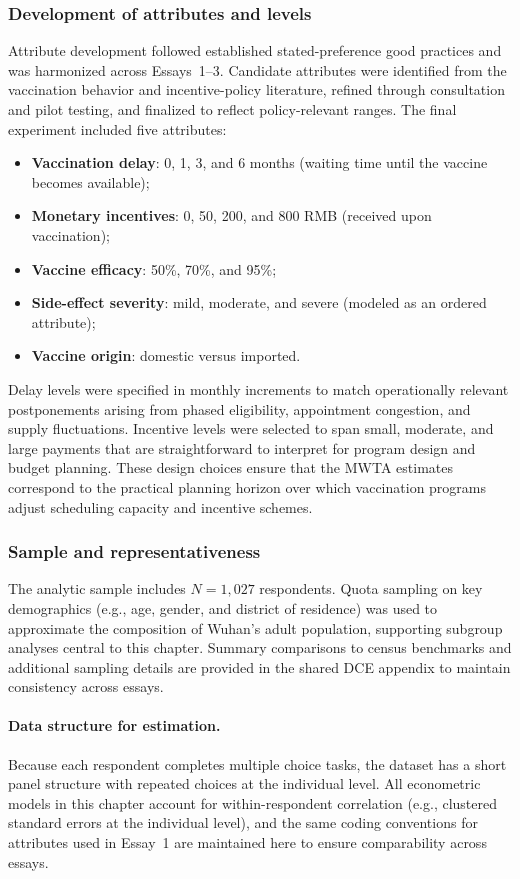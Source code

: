 \documentclass[doublespacing]{utdthesis}
\begin{document}
\subsubsection{Development of attributes and levels}
Attribute development followed established stated-preference good practices and was harmonized across Essays~1--3. Candidate attributes were identified from the vaccination behavior and incentive-policy literature, refined through consultation and pilot testing, and finalized to reflect policy-relevant ranges. The final experiment included five attributes:
\begin{itemize}
  \item \textbf{Vaccination delay}: 0, 1, 3, and 6 months (waiting time until the vaccine becomes available);
  \item \textbf{Monetary incentives}: 0, 50, 200, and 800 RMB (received upon vaccination);
  \item \textbf{Vaccine efficacy}: 50\%, 70\%, and 95\%;
  \item \textbf{Side-effect severity}: mild, moderate, and severe (modeled as an ordered attribute);
  \item \textbf{Vaccine origin}: domestic versus imported.
\end{itemize}
Delay levels were specified in monthly increments to match operationally relevant postponements arising from phased eligibility, appointment congestion, and supply fluctuations. Incentive levels were selected to span small, moderate, and large payments that are straightforward to interpret for program design and budget planning. These design choices ensure that the MWTA estimates correspond to the practical planning horizon over which vaccination programs adjust scheduling capacity and incentive schemes.

\subsubsection{Sample and representativeness}
The analytic sample includes $N=1{,}027$ respondents. Quota sampling on key demographics (e.g., age, gender, and district of residence) was used to approximate the composition of Wuhan’s adult population, supporting subgroup analyses central to this chapter. Summary comparisons to census benchmarks and additional sampling details are provided in the shared DCE appendix to maintain consistency across essays.

\paragraph{Data structure for estimation.}
Because each respondent completes multiple choice tasks, the dataset has a short panel structure with repeated choices at the individual level. All econometric models in this chapter account for within-respondent correlation (e.g., clustered standard errors at the individual level), and the same coding conventions for attributes used in Essay~1 are maintained here to ensure comparability across essays.
\end{document}
